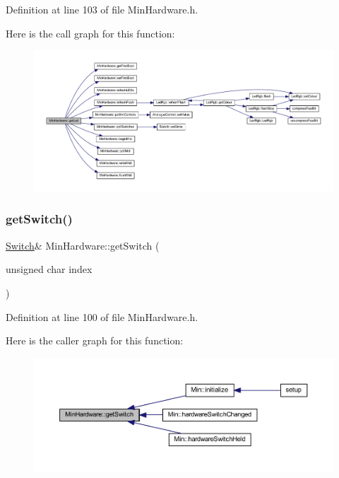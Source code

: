 Definition at line 103 of file Min\+Hardware.\+h.

Here is the call graph for this function\+:
\nopagebreak
\begin{figure}[H]
\begin{center}
\leavevmode
\includegraphics[width=350pt]{class_min_hardware_af0f53594d24df7d75360ccccd0f582d3_cgraph}
\end{center}
\end{figure}
\mbox{\label{class_min_hardware_a7e3fdfca776cd833f4ab859c25232c9c}} 
\subsubsection{\texorpdfstring{get\+Switch()}{getSwitch()}\hspace{0.1cm}{\footnotesize\ttfamily [1/2]}}
{\footnotesize\ttfamily \hyperlink{class_switch}{Switch}\& Min\+Hardware\+::get\+Switch (\begin{DoxyParamCaption}\item[{unsigned char}]{index }\end{DoxyParamCaption})\hspace{0.3cm}{\ttfamily [inline]}}



Definition at line 100 of file Min\+Hardware.\+h.

Here is the caller graph for this function\+:
\nopagebreak
\begin{figure}[H]
\begin{center}
\leavevmode
\includegraphics[width=350pt]{class_min_hardware_a7e3fdfca776cd833f4ab859c25232c9c_icgraph}
\end{center}
\end{figure}
\mbox{\label{class_min_hardware_a874ff2353b74b2fefadd2f9322995617}} 
